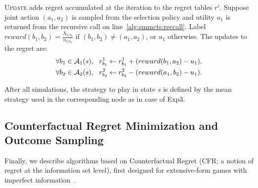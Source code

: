 \textsc{Update} adds regret accumulated at the iteration to
the regret tables $r^i$. Suppose joint action $(a_1,a_2)$ is
sampled from the selection policy and utility $u_1$ is returned from the recursive call on line~\ref{alg:smmcts:reccall}.
Label $reward(b_1,b_2) = \frac{X_{b_1b_2}}{n_{b_1b_2}}$ if
$(b_1,b_2) \not= (a_1,a_2)$, or $u_1$ otherwise. The updates to the regret are:
\begin{eqnarray}
\forall b_1 \in \mathcal{A}_1(s), ~~  r^1_{b_1} \leftarrow r^1_{b_1} + ( reward(b_1, a_2) - u_1 ),\\
\forall b_2 \in \mathcal{A}_2(s), ~~  r^2_{b_2} \leftarrow r^2_{b_2} - ( reward(a_1, b_2) - u_1).
\end{eqnarray}

After all simulations, the strategy to play in state $s$ is defined by the mean strategy used in the corresponding node as in case of Exp3.

\subsection{Counterfactual Regret Minimization and Outcome Sampling} \label{sec:algs:cfros}

Finally, we describe algorithms based on Counterfactual Regret (CFR; a notion of regret at the information set level),
first designed for extensive-form games with imperfect information~\cite{CFR}.

